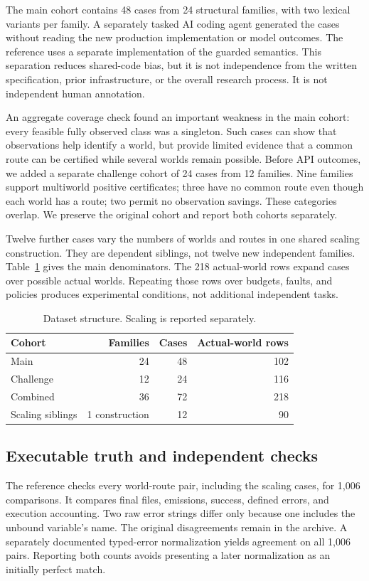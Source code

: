 \documentclass[conference]{IEEEtran}
\begin{document}
The main cohort contains 48 cases from 24 structural families, with two lexical variants per family. A separately tasked AI coding agent generated the cases without reading the new production implementation or model outcomes. The reference uses a separate implementation of the guarded semantics. This separation reduces shared-code bias, but it is not independence from the written specification, prior infrastructure, or the overall research process. It is not independent human annotation.

An aggregate coverage check found an important weakness in the main cohort: every feasible fully observed class was a singleton. Such cases can show that observations help identify a world, but provide limited evidence that a common route can be certified while several worlds remain possible. Before API outcomes, we added a separate challenge cohort of 24 cases from 12 families. Nine families support multiworld positive certificates; three have no common route even though each world has a route; two permit no observation savings. These categories overlap. We preserve the original cohort and report both cohorts separately.

Twelve further cases vary the numbers of worlds and routes in one shared scaling construction. They are dependent siblings, not twelve new independent families. Table~\ref{tab:data} gives the main denominators. The 218 actual-world rows expand cases over possible actual worlds. Repeating those rows over budgets, faults, and policies produces experimental conditions, not additional independent tasks.

\begin{table}[t]
\centering
\caption{Dataset structure. Scaling is reported separately.}
\label{tab:data}
\begin{tabular}{lrrr}
\toprule
Cohort & Families & Cases & Actual-world rows\\
\midrule
Main &24&48&102\\
Challenge &12&24&116\\
Combined &36&72&218\\
Scaling siblings &1 construction&12&90\\
\bottomrule
\end{tabular}
\end{table}

\subsection{Executable truth and independent checks}
The reference checks every world-route pair, including the scaling cases, for 1,006 comparisons. It compares final files, emissions, success, defined errors, and execution accounting. Two raw error strings differ only because one includes the unbound variable's name. The original disagreements remain in the archive. A separately documented typed-error normalization yields agreement on all 1,006 pairs. Reporting both counts avoids presenting a later normalization as an initially perfect match.
\end{document}
